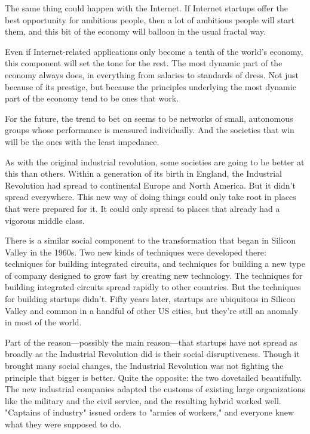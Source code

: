 The
                  same thing could happen with the Internet. If Internet
                  startups offer the best opportunity for ambitious people, then
                  a lot of ambitious people will start them, and this bit of the
                  economy will balloon in the usual fractal way.

Even
                  if Internet-related applications only become a tenth of the
                  world's economy, this component will set the tone for the
                  rest. The most dynamic part of the economy always does, in
                  everything from salaries to standards of dress. Not just
                  because of its prestige, but because the principles underlying
                  the most dynamic part of the economy tend to be ones that
                  work.

For the future, the trend to bet on seems to
                  be networks of small, autonomous groups whose performance is
                  measured individually. And the societies that win will be the
                  ones with the least impedance.

As with the original
                  industrial revolution, some societies are going to be better
                  at this than others. Within a generation of its birth in
                  England, the Industrial Revolution had spread to continental
                  Europe and North America. But it didn't spread everywhere.
                  This new way of doing things could only take root in places
                  that were prepared for it. It could only spread to places that
                  already had a vigorous middle class.

There is a
                  similar social component to the transformation that began in
                  Silicon Valley in the 1960s. Two new kinds of techniques were
                  developed there: techniques for building integrated circuits,
                  and techniques for building a new type of company designed to
                  grow fast by creating new technology. The techniques for
                  building integrated circuits spread rapidly to other
                  countries. But the techniques for building startups didn't.
                  Fifty years later, startups are ubiquitous in Silicon Valley
                  and common in a handful of other US cities, but they're still
                  an anomaly in most of the world.

Part of the
                  reason---possibly the main reason---that startups have
                  not spread as broadly as the Industrial Revolution did is
                  their social disruptiveness. Though it brought many social
                  changes, the Industrial Revolution was not fighting the
                  principle that bigger is better. Quite the opposite: the two
                  dovetailed beautifully. The new industrial companies adapted
                  the customs of existing large organizations like the military
                  and the civil service, and the resulting hybrid worked well.
                  "Captains of industry" issued orders to "armies of workers,"
                  and everyone knew what they were supposed to do.

